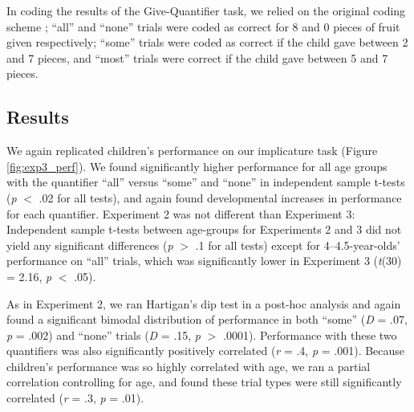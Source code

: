 \documentclass[man]{apa2}
\begin{document}
In coding the results of the Give-Quantifier task, we relied on the original coding scheme ; ``all'' and ``none'' trials were coded as correct for 8 and 0 pieces of fruit given respectively; ``some'' trials were coded as correct if the child gave between 2 and 7 pieces, and ``most'' trials were correct if the child gave between 5 and 7 pieces.

\subsection{Results}

We again replicated children's performance on our implicature task (Figure \ref{fig:exp3_perf}). We found significantly higher performance for all age groups with the quantifier ``all'' versus ``some'' and ``none'' in independent sample t-tests (\emph{p} $<$ .02 for all tests), and again found developmental increases in performance for each quantifier. Experiment 2 was not different than Experiment 3: Independent sample t-tests between  age-groups for Experiments 2 and 3 did not yield any significant differences (\emph{p} $>$ .1 for all tests) except for 4--4.5-year-olds' performance on ``all'' trials, which was significantly lower in Experiment 3 (\emph{t}(30) = 2.16, \emph{p} $<$ .05).


As in Experiment 2, we ran Hartigan's dip test in a post-hoc analysis and again found a significant bimodal distribution of performance in both ``some'' (\textit{D} = .07, \textit{p} = .002) and ``none'' trials (\textit{D} = .15, \textit{p} $>$ .0001). Performance with these two quantifiers was also significantly positively correlated (\emph{r} = .4, \emph{p} = .001). Because children's performance was so highly correlated with age, we ran a partial correlation controlling for age, and found these trial types were still significantly correlated (\emph{r} = .3, \emph{p} = .01).


%
\end{document}
